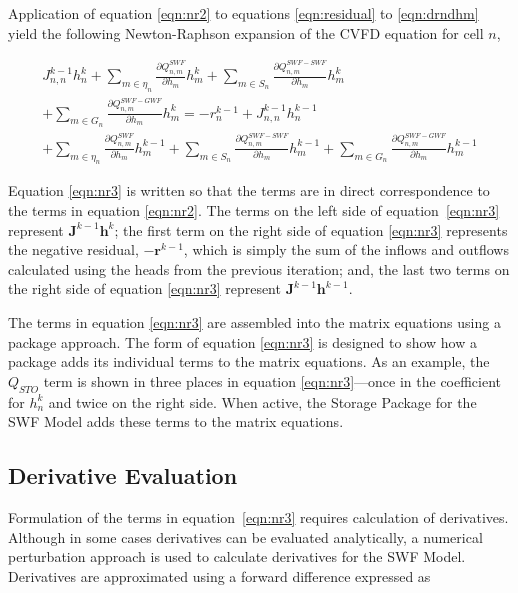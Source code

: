 \documentclass[fleqn]{article}
\newcommand{\matr}[1]{\mathbf{#1}}
\begin{document}
Application of equation \ref{eqn:nr2} to equations \ref{eqn:residual} to \ref{eqn:drndhm} yield the following Newton-Raphson expansion of the CVFD equation for cell $n$,

\begin{equation}
\label{eqn:nr3}
\begin{split}
J_{n,n}^{k-1} h_n^k
+ \sum \limits_{m \in \eta_{n}} \frac{\partial Q_{n,m}^{SWF}}{\partial h_m} h_m^k
+ \sum \limits_{m \in S_{n}} \frac{\partial Q_{n,m}^{SWF-SWF}}{\partial h_m} h_m^k \\
+ \sum \limits_{m \in G_{n}} \frac{\partial Q_{n,m}^{SWF-GWF}}{\partial h_m} h_m^k 
= 
-r_n^{k-1}
+ J_{n,n}^{k-1} h_n^{k-1} \\
+ \sum \limits_{m \in \eta_{n}} \frac{\partial Q_{n,m}^{SWF}}{\partial h_m} h_m^{k-1}
+ \sum \limits_{m \in S_{n}} \frac{\partial Q_{n,m}^{SWF-SWF}}{\partial h_m} h_m^{k-1}
+ \sum \limits_{m \in G_{n}} \frac{\partial Q_{n,m}^{SWF-GWF}}{\partial h_m} h_m^{k-1}
\end{split}
\end{equation}

\noindent Equation \ref{eqn:nr3} is written so that the terms are in direct correspondence to the terms in equation \ref{eqn:nr2}.  The terms on the left side of equation~\ref{eqn:nr3} represent $\matr{J}^{k-1} \matr{h}^{k}$; the first term on the right side of equation \ref{eqn:nr3} represents the negative residual, $-\matr{r}^{k-1}$, which is simply the sum of the inflows and outflows calculated using the heads from the previous iteration; and, the last two terms on the right side of equation \ref{eqn:nr3} represent $\matr{J}^{k-1} \matr{h}^{k-1}$.  

The terms in equation \ref{eqn:nr3} are assembled into the matrix equations using a package approach.  The form of equation \ref{eqn:nr3} is designed to show how a package adds its individual terms to the matrix equations.  As an example, the $Q_{STO}$ term is shown in three places in equation \ref{eqn:nr3}---once in the coefficient for $h^k_n$ and twice on the right side.  When active, the Storage Package for the SWF Model adds these terms to the matrix equations.

\subsection{Derivative Evaluation}

Formulation of the terms in equation~\ref{eqn:nr3} requires calculation of derivatives.  Although in some cases derivatives can be evaluated analytically, a numerical perturbation approach is used to calculate derivatives for the SWF Model.  Derivatives are approximated using a forward difference expressed as
\end{document}

